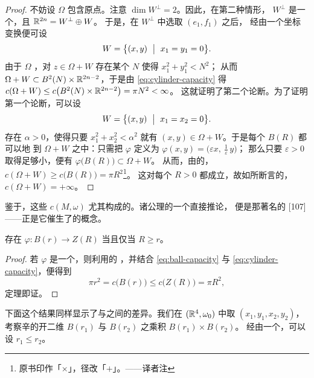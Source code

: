 \begin{proof}
不妨设 $\Omega$ 包含原点。注意 $\dim W^{\perp}=2$。因此，在第二种情形，%
$W^{\perp}$ 是一个\trSymplectic\trSubspace，且 $\mathbb{R}^{2n}=W^{\perp}\oplus W$。%
于是，在 $W^{\perp}$ 中选取\trSymplecticBasis{} $(e_1,f_1)$ 之后，%
经由一个\trLinear\trSymplectic{}坐标变换便可设
\[
W=\bigl\{(x,y)\ \bigm|\ x_1=y_1=0\bigr\}.
\]
由于 $\Omega$ \trBounded，对 $z\in\Omega+W$ 存在某个 $N$ 使得 $x_1^{2}+y_1^{2}<N^{2}$；%
从而 $\Omega+W\subset B^{2}(N)\times\mathbb{R}^{2n-2}$，于是由%
\eqref{eq:cylinder-capacity} 得%
$c(\Omega+W)\leq c\bigl(B^{2}(N)\times\mathbb{R}^{2n-2}\bigr)=\pi N^{2}<\infty$。%
这就证明了第二个论断。为了证明第一个论断，可以设
\[
W=\bigl\{(x,y)\ \bigm|\ x_1=x_2=0\bigr\}.
\]
存在 $\alpha>0$，使得只要 $x_1^{2}+x_2^{2}<\alpha^{2}$ 就有%
$(x,y)\in\Omega+W$。于是每个\trBall{} $B(R)$ 都可以\trSymplectic{}地%
\trEmbedding{}到 $\Omega+W$ 之中：只需把\trLinear\trSymplectic\trMapping{}%
$\varphi$ 定义为 $\varphi(x,y)=\bigl(\varepsilon x,\ \frac{1}{\varepsilon}\,y\bigr)$；%
那么只要 $\varepsilon>0$ 取得足够小，便有 $\varphi\bigl(B(R)\bigr)\subset\Omega+W$。%
从而，由\trCapacity{}的\trMonotonicity，$c(\Omega+W)\geq c\bigl(B(R)\bigr)=\pi R^{2}$\footnote{原书印作「$\times$」，径改「$+$」。——译者注}。%
这对每个 $R>0$ 都成立，故如所断言的，$c(\Omega+W)=+\infty$。
\end{proof}

鉴于\trMonotonicity，这些\trSymplecticInvariant{} $c(M,\omega)$%
尤其构成\trSymplecticEmbedding{}的\trObstruction。诸公理的一个直接推论，%
便是\trGromov{}那著名的\trSqueezingTheorem{} [107]——正是它催生了\trCapacity{}的概念。

\begin{theorem}[\trGromov\trSqueezingTheorem]\label{thm:capacity-squeezing}
存在\trSymplecticEmbedding{} $\varphi:B(r)\to Z(R)$ 当且仅当 $R\geq r$。
\end{theorem}

\begin{proof}
若 $\varphi$ 是一个\trSymplecticEmbedding，则利用\trCapacity{}的%
\trMonotonicity，并结合 \eqref{eq:ball-capacity} 与%
\eqref{eq:cylinder-capacity}，便得到
\[
\pi r^{2}=c\bigl(B(r)\bigr)\leq c\bigl(Z(R)\bigr)=\pi R^{2},
\]
定理即证。
\end{proof}

下面这个结果同样显示了\trVolumePreserving{}与\trSymplecticDiffeomorphism{}之间的差异。我们在%
$(\mathbb{R}^{4},\omega_0)$ 中取\trSymplecticCoordinates{} $(x_1,y_1,x_2,y_2)$，%
考察辛的开二维\trBall{} $B(r_1)$ 与 $B(r_2)$ 之乘积 $B(r_1)\times B(r_2)$。%
经由一个\trLinear\trSymplectic\trMapping，可以设 $r_1\leq r_2$。

